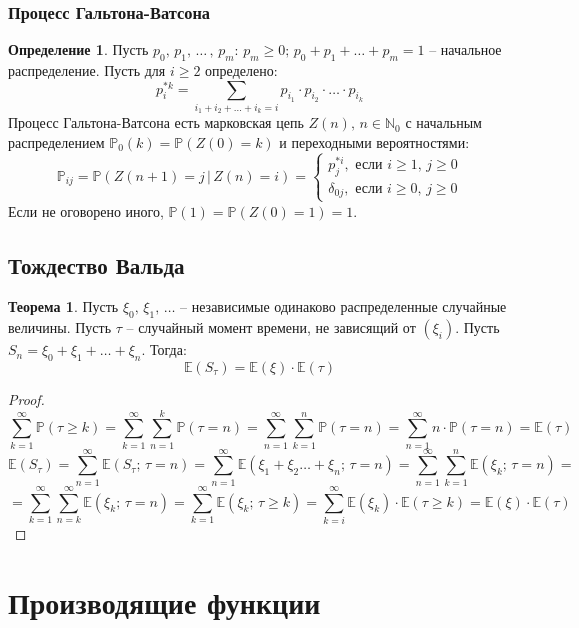 \documentclass[12pt]{article}
\theoremstyle{definition}
\newtheorem{theorem}{Теорема}[section]
\newtheorem{definition}{Определение}
\newcommand{\N}{\mathbb{N}}
\newcommand{\E}{\mathbb{E}}
\newcommand{\prob}{\mathbb{P}}
\begin{document}
\subsubsection{Процесс Гальтона-Ватсона}

\begin{definition}
    Пусть $p_0,\,p_1,\,\ldots\,,\,p_m:\,p_m\geq 0;\,p_0+p_1+\ldots+p_m=1$ – начальное распределение. Пусть для $i\geq 2$ определено: $$p_i^{*k}=\sum_{i_1+i_2+\ldots+i_k=i}p_{i_1}\cdot p_{i_2}\cdot\ldots\cdot p_{i_k}$$
    Процесс Гальтона-Ватсона есть марковская цепь $Z(n),\, n\in \N_0$ с начальным распределением $\prob_0(k)=\prob(Z(0)=k)$ и переходными вероятностями:
    $$\prob_{ij}=\prob(Z(n+1)=j\,|\,Z(n)=i)=\begin{cases}
        p_j^{*i},\text{ если }i\geq 1,\,j\geq 0\\
        \delta_{0j},\text{ если }i\geq 0,\,j\geq 0
    \end{cases}$$
    Если не оговорено иного, $\prob(1)=\prob(Z(0)=1)=1$.
\end{definition}

\subsection{Тождество Вальда}

\begin{theorem}
    Пусть $\xi_0,\,\xi_1,\,\ldots$ – независимые одинаково распределенные случайные величины. Пусть $\tau$ – случайный момент времени, не зависящий от $(\xi_i)$. Пусть $S_n=\xi_0+\xi_1+\ldots+\xi_n$. Тогда:
    $$\E(S_\tau)=\E(\xi)\cdot\E(\tau)$$ 
\end{theorem}
\begin{proof}
    $$\sum_{k=1}^{\infty}\prob(\tau\geq k)=\sum_{k=1}^{\infty}\sum_{n=1}^{k}\prob(\tau=n)=\sum_{n=1}^{\infty}\sum_{k=1}^{n}\prob(\tau=n)=\sum_{n=1}^{\infty}n\cdot\prob(\tau=n)=\E(\tau)$$
    $$\E(S_\tau)=\sum_{n=1}^{\infty}\E(S_\tau;\,\tau=n)=\sum_{n=1}^{\infty}\E(\xi_1+\xi_2\ldots+\xi_n;\,\tau=n)=\sum_{n=1}^{\infty}\sum_{k=1}^{n}\E(\xi_k;\,\tau=n)=$$
    $$=\sum_{k=1}^{\infty}\sum_{n=k}^{\infty}\E(\xi_k;\,\tau=n)=\sum_{k=1}^{\infty}\E(\xi_k;\,\tau\geq k)=\sum_{k=i}^{\infty}\E(\xi_k)\cdot\E(\tau\geq k)=\E(\xi)\cdot\E(\tau)$$
\end{proof}

\section{Производящие функции}
\end{document}
